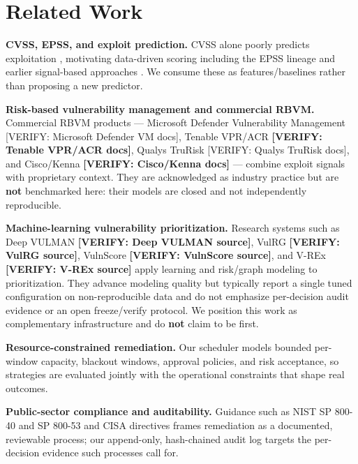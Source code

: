 \section{Related Work}

\textbf{CVSS, EPSS, and exploit prediction.} CVSS alone poorly predicts exploitation
\cite{allodi2014comparing}, motivating data-driven scoring including the EPSS lineage
\cite{jacobs2021epss} and earlier signal-based approaches \cite{sabottke2015vulnerability}.
We consume these as features/baselines rather than proposing a new predictor.

\textbf{Risk-based vulnerability management and commercial RBVM.} Commercial RBVM
products --- Microsoft Defender Vulnerability Management [VERIFY: Microsoft Defender
VM docs], Tenable VPR/ACR \textbf{[VERIFY: Tenable VPR/ACR docs]}, Qualys TruRisk [VERIFY:
Qualys TruRisk docs], and Cisco/Kenna \textbf{[VERIFY: Cisco/Kenna docs]} --- combine exploit
signals with proprietary context. They are acknowledged as industry practice but
are \textbf{not} benchmarked here: their models are closed and not independently
reproducible.

\textbf{Machine-learning vulnerability prioritization.} Research systems such as Deep
VULMAN \textbf{[VERIFY: Deep VULMAN source]}, VulRG \textbf{[VERIFY: VulRG source]}, VulnScore
\textbf{[VERIFY: VulnScore source]}, and V-REx \textbf{[VERIFY: V-REx source]} apply learning and
risk/graph modeling to prioritization. They advance modeling quality but typically
report a single tuned configuration on non-reproducible data and do not emphasize
per-decision audit evidence or an open freeze/verify protocol. We position this
work as complementary infrastructure and do \textbf{not} claim to be first.

\textbf{Resource-constrained remediation.} Our scheduler models bounded per-window
capacity, blackout windows, approval policies, and risk acceptance, so strategies
are evaluated jointly with the operational constraints that shape real outcomes.

\textbf{Public-sector compliance and auditability.} Guidance such as NIST SP 800-40
\cite{nist80040r4} and SP 800-53 \cite{nist80053r5} and CISA directives \cite{cisa_bod2201}
frames remediation as a documented, reviewable process; our append-only,
hash-chained audit log targets the per-decision evidence such processes call for.
